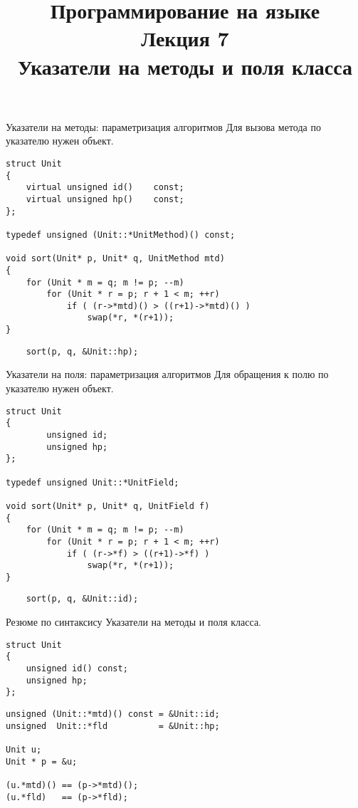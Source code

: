 \documentclass[aspectration=1610,t]{beamer}
\title{{\bf Программирование на языке \langcpp\protect\\Лекция
7\protect\vspace{1em}\\}Указатели на методы и поля класса}
\begin{document}
\begin{frame} 
  \titlepage
\end{frame}


\begin{frame}[fragile]{Указатели на методы: параметризация алгоритмов}
Для вызова метода по указателю нужен объект.
    \begin{lstlisting}
struct Unit 
{
    virtual unsigned id()    const;
    virtual unsigned hp()    const;
};

typedef unsigned (Unit::*UnitMethod)() const;

void sort(Unit* p, Unit* q, UnitMethod mtd)
{
    for (Unit * m = q; m != p; --m)
        for (Unit * r = p; r + 1 < m; ++r)
            if ( (r->*mtd)() > ((r+1)->*mtd)() )
                swap(*r, *(r+1));
}
    \end{lstlisting}
    \begin{lstlisting}
    sort(p, q, &Unit::hp);
    \end{lstlisting}
\end{frame}


\begin{frame}[fragile]{Указатели на поля: параметризация алгоритмов}
Для обращения к полю по указателю нужен объект.
    \begin{lstlisting}
struct Unit 
{
        unsigned id;
        unsigned hp;
};

typedef unsigned Unit::*UnitField;

void sort(Unit* p, Unit* q, UnitField f)
{
    for (Unit * m = q; m != p; --m)
        for (Unit * r = p; r + 1 < m; ++r)
            if ( (r->*f) > ((r+1)->*f) )
                swap(*r, *(r+1));
}
    \end{lstlisting}
    \begin{lstlisting}
    sort(p, q, &Unit::id);
    \end{lstlisting}
\end{frame}

\begin{frame}[fragile]{Резюме по синтаксису}
Указатели на методы и поля класса. 
    \begin{lstlisting}
struct Unit 
{ 
    unsigned id() const;
    unsigned hp;
};
    \end{lstlisting}
    \begin{lstlisting}
unsigned (Unit::*mtd)() const = &Unit::id;
unsigned  Unit::*fld          = &Unit::hp;

Unit u;
Unit * p = &u;

(u.*mtd)() == (p->*mtd)();
(u.*fld)   == (p->*fld);
    \end{lstlisting}

\end{frame}
\end{document}
